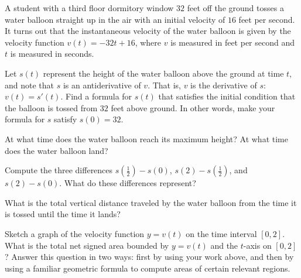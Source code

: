 \begin{pa} \label{PA:4.5}
A student with a third floor dormitory window $32$ feet off the ground tosses a water balloon straight up in the air with an initial velocity of $16$ feet per second.  It turns out that the instantaneous velocity of the water balloon is given by the velocity function $v(t) = -32t + 16$, where $v$ is measured in feet per second and $t$ is measured in seconds.
\ba
\item Let $s(t)$ represent the height of the water balloon above the ground at time $t$, and note that $s$ is an antiderivative of $v$.  That is, $v$ is the derivative of $s$: $v(t) = s'(t)$.  Find a formula for $s(t)$ that satisfies the initial condition that the balloon is tossed from $32$ feet above ground.  In other words, make your formula for $s$ satisfy $s(0) = 32$.
\item At what time does the water balloon reach its maximum height?  At what time does the water balloon land?
\item Compute the three differences $s \left( \frac{1}{2} \right) - s(0)$, $s(2) - s \left( \frac{1}{2} \right)$, and $s(2) - s(0)$.  What do these differences represent?
\item What is the total vertical distance traveled by the water balloon from the time it is tossed until the time it lands?
\item Sketch a graph of the velocity function $y = v(t)$ on the time interval $[0,2]$.  What is the total net signed area bounded by $y = v(t)$ and the $t$-axis on $[0,2]$?  Answer this question in two ways:  first by using your work above, and then by using a familiar geometric formula to compute areas of certain relevant regions.
\ea
\end{pa} 

\afterpa